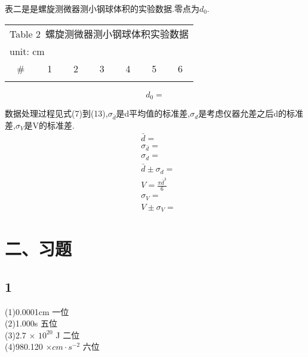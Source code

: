 \documentclass[a4paper,10pt,notitlepage]{report}
\begin{document}
	表二是是螺旋测微器测小钢球体积的实验数据.零点为$d_0$. \\
	
\begin{table}[htbp]
\centering
	\begin{tabular}{|c|c|c|c|c|c|c|}
	
		\multicolumn{7}{c}{Table 2\ 螺旋测微器测小钢球体积实验数据} \\
		\multicolumn{7}{l}{\scriptsize{unit: cm}} \\
		\hline
		\# & 1 & 2 & 3 & 4 & 5 & 6 \\
		\hline
		\\
		\hline

	\end{tabular}
\end{table}
	
\begin{equation}
	d_0 = 
\end{equation}
	
	数据处理过程见式(7)到(13),$\sigma_{\bar{d}}$是d平均值的标准差,$\sigma_d$是考虑仪器允差之后d的标准差,$\sigma_V$是V的标准差. \\
		
\begin{align}
	&\bar{d} = \\
	&\sigma_{\bar{d}} = \\
	&\sigma_d = \\
	&\bar{d} \pm \sigma_d = \\
	&V = \frac{\pi \bar{d}^3}{6} \\
	&\sigma_V = \\
	&V \pm \sigma_V = 
\end{align}
	
\section*{二、习题}
\subsection*{1}
	
	(1)0.0001cm 一位 \\
	
	(2)1.000s 五位 \\
	
	(3)2.7 $\times$ $10^{20}$ J 二位 \\
	
	(4)980.120 $\times cm \cdot s^{-2}$ 六位 \\
\end{document}
